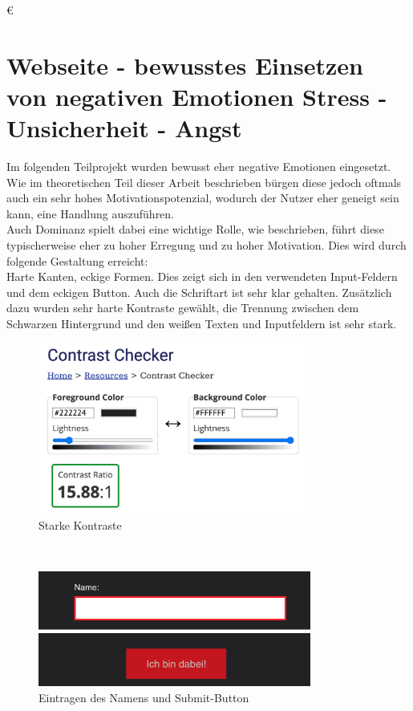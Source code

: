 €\documentclass[./dokumentation.tex]{subfiles}
\begin{document}
\section{Webseite - bewusstes Einsetzen von negativen Emotionen Stress - Unsicherheit - Angst}
Im folgenden Teilprojekt wurden bewusst eher negative Emotionen eingesetzt. Wie im theoretischen Teil dieser Arbeit beschrieben bürgen diese jedoch oftmals auch ein sehr hohes Motivationspotenzial, wodurch der Nutzer eher geneigt sein kann, eine Handlung auszuführen.\\
Auch Dominanz spielt dabei eine wichtige Rolle, wie beschrieben, führt diese typischerweise eher zu hoher Erregung und zu hoher Motivation. Dies wird durch folgende Gestaltung erreicht:\\
Harte Kanten, eckige Formen. Dies zeigt sich in den verwendeten Input-Feldern und dem eckigen Button. Auch die Schriftart ist sehr klar gehalten. Zusätzlich dazu wurden sehr harte Kontraste gewählt, die Trennung zwischen dem Schwarzen Hintergrund und den weißen Texten und Inputfeldern ist sehr stark.

\begin{figure}[H]
    \centering
    \includegraphics[width=0.8\textwidth]{bilder/contrast.png}
    \caption{Starke Kontraste} %
    \label{fig12:contrast}
\end{figure}\\

\begin{figure}[H]
    \centering
    \includegraphics[width=0.8\textwidth]{bilder/name-bin-dabei.png}
    \caption{Eintragen des Namens und Submit-Button} %
    \label{fig13:name}
\end{figure}\\
\end{document}
